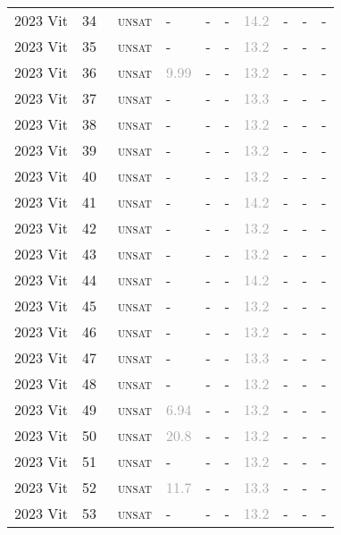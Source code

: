 \begin{center}
{\begin{longtable}{@{}llllllllll@{}}
2023 Vit & 34 & ~\textsc{unsat} & - & - & - & \textcolor{darkgray}{14.2} & - & - & - \\
2023 Vit & 35 & ~\textsc{unsat} & - & - & - & \textcolor{darkgray}{13.2} & - & - & - \\
2023 Vit & 36 & ~\textsc{unsat} & \textcolor{darkgray}{9.99} & - & - & \textcolor{darkgray}{13.2} & - & - & - \\
2023 Vit & 37 & ~\textsc{unsat} & - & - & - & \textcolor{darkgray}{13.3} & - & - & - \\
2023 Vit & 38 & ~\textsc{unsat} & - & - & - & \textcolor{darkgray}{13.2} & - & - & - \\
2023 Vit & 39 & ~\textsc{unsat} & - & - & - & \textcolor{darkgray}{13.2} & - & - & - \\
2023 Vit & 40 & ~\textsc{unsat} & - & - & - & \textcolor{darkgray}{13.2} & - & - & - \\
2023 Vit & 41 & ~\textsc{unsat} & - & - & - & \textcolor{darkgray}{14.2} & - & - & - \\
2023 Vit & 42 & ~\textsc{unsat} & - & - & - & \textcolor{darkgray}{13.2} & - & - & - \\
2023 Vit & 43 & ~\textsc{unsat} & - & - & - & \textcolor{darkgray}{13.2} & - & - & - \\
2023 Vit & 44 & ~\textsc{unsat} & - & - & - & \textcolor{darkgray}{14.2} & - & - & - \\
2023 Vit & 45 & ~\textsc{unsat} & - & - & - & \textcolor{darkgray}{13.2} & - & - & - \\
2023 Vit & 46 & ~\textsc{unsat} & - & - & - & \textcolor{darkgray}{13.2} & - & - & - \\
2023 Vit & 47 & ~\textsc{unsat} & - & - & - & \textcolor{darkgray}{13.3} & - & - & - \\
2023 Vit & 48 & ~\textsc{unsat} & - & - & - & \textcolor{darkgray}{13.2} & - & - & - \\
2023 Vit & 49 & ~\textsc{unsat} & \textcolor{darkgray}{6.94} & - & - & \textcolor{darkgray}{13.2} & - & - & - \\
2023 Vit & 50 & ~\textsc{unsat} & \textcolor{darkgray}{20.8} & - & - & \textcolor{darkgray}{13.2} & - & - & - \\
2023 Vit & 51 & ~\textsc{unsat} & - & - & - & \textcolor{darkgray}{13.2} & - & - & - \\
2023 Vit & 52 & ~\textsc{unsat} & \textcolor{darkgray}{11.7} & - & - & \textcolor{darkgray}{13.3} & - & - & - \\
2023 Vit & 53 & ~\textsc{unsat} & - & - & - & \textcolor{darkgray}{13.2} & - & - & - \\

\end{longtable}}
\end{center}
